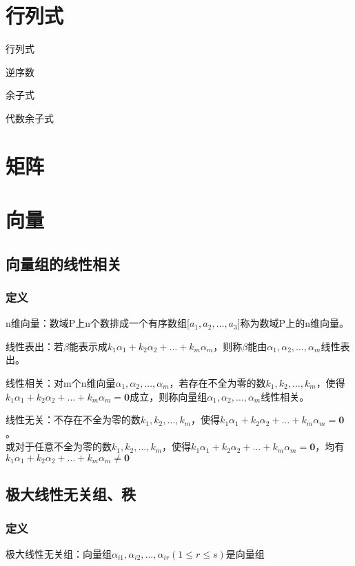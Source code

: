 \documentclass{ctexart}
\begin{document}
\section{行列式}


行列式

逆序数

余子式

代数余子式

\section{矩阵}

\section{向量}
 
\subsection{向量组的线性相关}

\subsubsection{定义}



n维向量：数域P上n个数排成一个有序数组[$a_1,a_2,\dots ,a_3$]称为数域P上的n维向量。

线性表出：若$\beta$能表示成$k_1\alpha_1+k_2\alpha_2+\dots +k_m\alpha_m$，则称$\beta$能由$\alpha_1,\alpha_2,\dots,\alpha_m$线性表出。

线性相关：对m个n维向量$\alpha_1,\alpha_2,\dots,\alpha_m$，若存在不全为零的数$k_1,k_2,\dots,k_m$，使得$k_1\alpha_1+k_2\alpha_2+\dots +k_m\alpha_m=\bm{0}$成立，则称向量组$\alpha_1,\alpha_2,\dots,\alpha_m$线性相关。

线性无关：不存在不全为零的数$k_1,k_2,\dots,k_m$，使得$k_1\alpha_1+k_2\alpha_2+\dots +k_m\alpha_m=\bm{0}$。\\
或对于任意不全为零的数$k_1,k_2,\dots,k_m$，使得$k_1\alpha_1+k_2\alpha_2+\dots +k_m\alpha_m=\bm{0}$，均有$k_1\alpha_1+k_2\alpha_2+\dots +k_m\alpha_m \neq \bm{0}$

\subsection{极大线性无关组、秩}

\subsubsection{定义}
极大线性无关组：向量组$\alpha_{i1},\alpha_{i2},\dots,\alpha_{ir}(1\leq r \leq s)$是向量组
\end{document}
